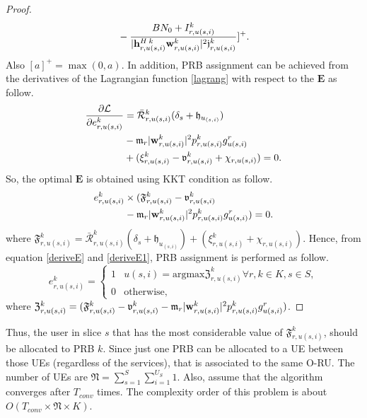 \documentclass[conference]{IEEEtran}
\begin{document}
\begin{proof}
\begin{equation}
\begin{split}
 &-\frac{BN_0 + I_{r,u(s,i)}^{k}}{{|\bold{h}_{r,u(s,i)}^{H \: k}} \bold{w}_{r,u(s,i)}^{k}|^2\mathfrak{j}_{r,u(s,i)}^{k}}]^+.\\
\end{split}
\end{equation}
Also $[a]^+ = \max(0,a)$.
In addition, PRB assignment can be achieved from the derivatives of the Lagrangian function \eqref{lagrang} with respect to the $\boldsymbol{E}$ as follow.
\begin{equation}\label{deriveE}
\begin{split}
\dfrac{\partial\mathcal{L}}{\partial e_{r,u(s,i)}^{k}} &= \mathcal{\bar{R}}_{r,u(s,i)}^{k}(\delta_s+\mathfrak{h}_{u_{(s,i)}})\\
&- \mathfrak{m}_{r}|\bold{w}_{r,u(s,i)}^{k}|^2 p_{r,u(s,i)}^{k} g_{u(s,i)}^r\\
&+( \xi^{k}_{r,u(s,i)}-\mathfrak{v}^{k}_{r,u(s,i)} +\chi_{r,u(s,i)})=0.\\
\end{split}
\end{equation}
So, the optimal $\boldsymbol{E}$ is obtained using KKT condition as follow.
\begin{equation}\label{deriveE1}
\begin{split}
e_{r,u(s,i)}^{k} &\times (\mathfrak{F}^{k}_{r,u(s,i)} -\mathfrak{v}^{k}_{r,u(s,i)}\\
& - \mathfrak{m}_{r}|\bold{w}_{r,u(s,i)}^{k}|^2 p_{r,u(s,i)}^{k} g_{u(s,i)}^r ) = 0.\\
\end{split}
\end{equation}
where $\mathfrak{F}^{k}_{r,u(s,i)} =\mathcal{\bar{R}}_{r,u(s,i)}^{k}(\delta_s+\mathfrak{h}_{u_{(s,i)}})+( \xi^{k}_{r,u(s,i)} +\chi_{r,u(s,i)}) $.
Hence, from equation \eqref{deriveE} and \eqref{deriveE1}, PRB assignment is performed as follow.
\begin{equation}
e_{r,u(s,i)}^{k} = 
  \begin{cases}
      1 & u(s,i) = \text{argmax} \mathfrak{Z}^{k}_{r,u(s,i)} \forall r, k \in K, s \in S, \\
      0 & \text{otherwise,}
    \end{cases}
\end{equation}
where $\mathfrak{Z}^{k}_{r,u(s,i)} = (\mathfrak{F}^{k}_{r,u(s,i)} -\mathfrak{v}^{k}_{r,u(s,i)}- \mathfrak{m}_{r}|\bold{w}_{r,u(s,i)}^{k}|^2 p_{r,u(s,i)}^{k} g_{u(s,i)}^r )$.
 \end{proof}
Thus, the user in slice $s$ that has  the most considerable value of $\mathfrak{F}^{k}_{r,u(s,i)}$, should be allocated to PRB $k$. Since just one PRB can be allocated to a UE between those UEs (regardless of the services), that is associated to the same O-RU.
The number of UEs are $\mathfrak{N} = \sum_{s=1}^{S}\sum_{i=1}^{U_S}1$. Also, assume that the algorithm converges after $T_{conv}$ times.
The complexity order of this problem is about $O( T_{conv} \times\mathfrak{N} \times K)$.
\end{document}
